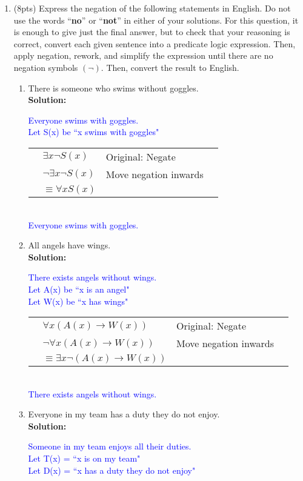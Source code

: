 \documentclass{article}
\renewcommand{\implies}{\rightarrow}
\newcommand{\sol}[1]{\textbf{Solution:\,}\textcolor{blue}{#1}}
\begin{document}
\begin{enumerate}
\newpage

\item(8pts) Express the negation of the following statements in English. Do not use the words ``\textbf{no}'' or ``\textbf{not}'' in either of your solutions. For this question, it is enough to give just the final answer, but to check that your reasoning is correct, convert each given sentence into a predicate logic expression. Then, apply negation, rework, and simplify the expression until there are no negation symbols $(\neg)$. Then, convert the result to English.
\begin{enumerate}
\item There is someone who swims without goggles. 
\\\sol{Everyone swims with goggles.
\\Let S(x) be ``x swims with goggles"
\\\begin{tabular}{llll}
&\quad$\exists x \neg S(x)$&Original: Negate\\
&\quad$\neg\exists x \neg S(x)$&Move negation inwards\\
&$\equiv\forall xS(x)$&\\
\end{tabular}\\
Everyone swims with goggles.}
\item All angels have wings.
\\\sol{There exists angels without wings.
\\Let A(x) be ``x is an angel"
\\Let W(x) be ``x has wings"
\\\begin{tabular}{llll}
&\quad $\forall x(A(x)\implies W(x))$&Original: Negate\\
&\quad $\neg\forall x(A(x)\implies W(x))$&Move negation inwards\\
&$\equiv\exists x\neg (A(x)\implies W(x))$&\\
\end{tabular}\\
There exists angels without wings.}
\item Everyone in my team has a duty they do not enjoy.
\\\sol{Someone in my team enjoys all their duties.
\\Let T(x) = ``x is on my team"
\\Let D(x) = ``x has a duty they do not enjoy"
\\\begin{tabular}{llll}

\end{tabular}}
\end{enumerate}
\end{enumerate}
\end{document}
